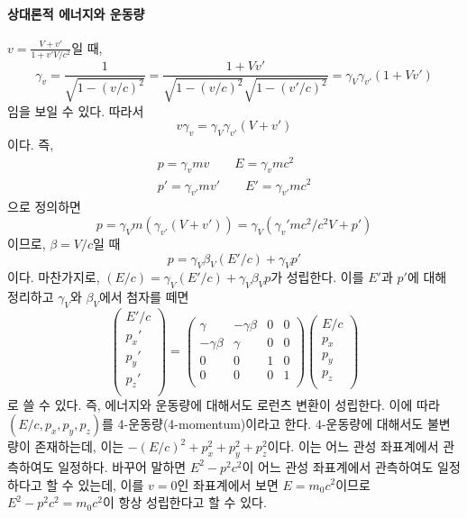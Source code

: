 \paragraph{상대론적 에너지와 운동량}
$v=\frac{V+v'}{1+v'V/c^2}$일 때, 
\begin{equation}
\gamma_v=\frac{1}{\sqrt{1-(v/c)^2}}=\frac{1+Vv'}{\sqrt{1-(v/c)^2}\sqrt{1-(v'/c)^2}}=\gamma_V\gamma_{v'}(1+Vv')
\end{equation}
임을 보일 수 있다. 따라서
\begin{equation}
v\gamma_v=\gamma_V\gamma_{v'}(V+v')
\end{equation}
이다. 즉, 
\begin{align}
p=\gamma_v mv\quad\quad E=\gamma_v mc^2\\
p'=\gamma_{v'} mv'\quad\quad E'=\gamma_{v'} mc^2
\end{align}
으로 정의하면 
\begin{equation}
p = \gamma_Vm(\gamma_{v'}(V+v'))=\gamma_V (\gamma_v'mc^2/c^2V+p')
\end{equation}
이므로, $\beta = V/c$일 때
\begin{equation}
p=\gamma_V\beta_V (E'/c)+\gamma_Vp'
\end{equation}
이다. 마찬가지로, $(E/c)=\gamma_V (E'/c)+\gamma_V\beta_V p$가 성립한다. 이를 $E'$과 $p'$에 대해 정리하고 $\gamma_V$와 $\beta_V$에서 첨자를 떼면
\begin{equation}
\begin{pmatrix}
E'/c\\
p_x'\\
p_y'\\
p_z'\\
\end{pmatrix}
=\begin{pmatrix}
\gamma& -\gamma\beta& 0& 0\\
-\gamma\beta & \gamma & 0 & 0 \\
0&0&1&0\\
0&0&0&1\\
\end{pmatrix}
\begin{pmatrix}
E/c\\
p_x\\
p_y\\
p_z\\
\end{pmatrix}
\end{equation}
로 쓸 수 있다. 즉, 에너지와 운동량에 대해서도 로런츠 변환이 성립한다. 이에 따라 $(E/c,p_x,p_y,p_z)$를 4-운동량(4-momentum)이라고 한다. 4-운동량에 대해서도 불변량이 존재하는데, 이는 $-(E/c)^2+p_x^2+p_y^2+p_z^2$이다. 이는 어느 관성 좌표계에서 관측하여도 일정하다. 바꾸어 말하면 $E^2-p^2c^2$이 어느 관성 좌표계에서 관측하여도 일정하다고 할 수 있는데, 이를 $v=0$인 좌표계에서 보면 $E=m_0c^2$이므로 $E^2-p^2c^2=m_0c^2$이 항상 성립한다고 할 수 있다.
